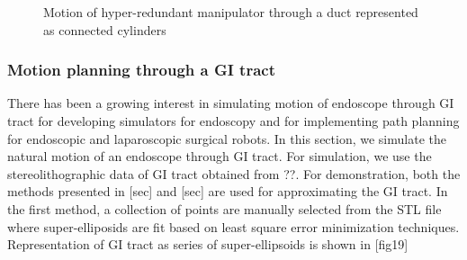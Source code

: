 \documentclass[12pt,a4]{article}
\begin{document}
\begin{figure}[ht!]
\begin{subfigure}{0.31\textwidth}
    \end{subfigure}%
    
    \caption{ Motion of hyper-redundant manipulator through a duct represented as connected cylinders\label{fig:pipelinemotion}}
\end{figure}


\subsubsection{Motion planning through a GI tract}
There has been a growing interest in simulating motion of endoscope through GI tract for developing simulators for endoscopy and for implementing path planning for endoscopic and laparoscopic surgical robots. In this section, we simulate the natural motion of an endoscope through GI tract. For simulation, we use the stereolithographic data of GI tract obtained from ??. For demonstration, both the methods presented in [sec] and [sec] are used for approximating the GI tract. In the first method, a collection of points are manually selected from the STL file where super-elliposids are fit based on least square error minimization techniques. Representation of GI tract as series of super-ellipsoids is shown in [fig19]
\end{document}
